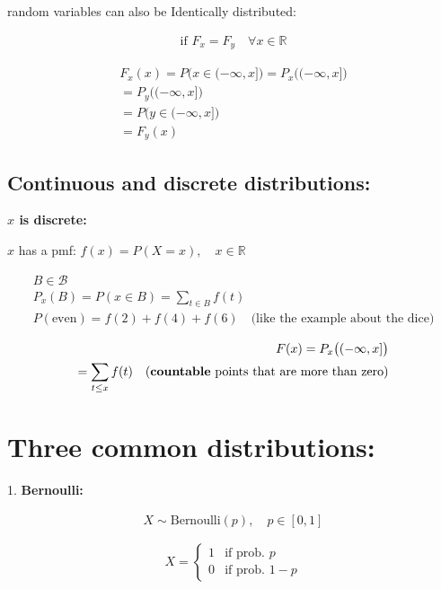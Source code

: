 \documentclass[10pt]{article}
\begin{document}
random variables can also be Identically distributed:

\begin{align*}
    \text{if } F_x = F_y \quad \forall x \in \mathbb{R}
\end{align*}

\newpage

\begin{align*}
    F_x(x) = P\big(x \in (-\infty, x]\big) = P_x\big((-\infty, x]\big)\\
    = P_y\big((-\infty, x]\big) \\
    = P\big(y \in (-\infty, x]\big)\\
    = F_y(x)
\end{align*}

\subsection{Continuous and discrete distributions: }

\textbf{$x$ is discrete: }

$x$ has a pmf: $f(x) = P(X=x), \quad x\in\mathbb{R}$

\begin{align*}
    B \in \mathcal{B}\\
    P_x(B) = P(x \in B) = \sum_{t \in B} f(t)\\
    P(\text{even}) = f(2) + f(4) + f(6) \quad\text{(like the example about the dice)}
\end{align*}

\begin{align*}
    F(x) = P_x\big((-\infty, x]\big)\\
    = \sum_{t \leq x} f(t) \quad\text{(\textbf{countable} points that are more than zero)}
\end{align*}

\newpage

\section{Three common  distributions: }

1. \textbf{Bernoulli:} 

\begin{align*}
    X \sim \text{Bernoulli}(p), \quad p \in [0, 1]
\end{align*}

\[
    X = 
    \begin{cases}
        1 & \text{if prob. }p\\
        0 & \text{if prob. } 1-p
    \end{cases}
\]
\end{document}
